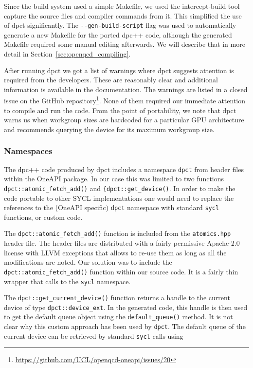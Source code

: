 \documentclass[../main]{subfiles}
\begin{document}
Since the build system used a simple Makefile, we used the intercept-build tool capture the source files and compiler commands from it.
This simplified the use of dpct significantly.
The \verb !--gen-build-script! flag was used to automatically generate a new Makefile for the ported dpc++ code, although the generated Makefile required some manual editing afterwards.
We will describe that in more detail in Section~\ref{sec:openqcd_compiling}.

After running dpct we got a list of warnings where dpct suggests attention is required from the developers.
These are reasonably clear and additional information is available in the documentation.
The warnings are listed in a closed issue on the GitHub repository\footnote{\url{https://github.com/UCL/openqcd-oneapi/issues/20}}.
None of them required our immediate attention to compile and run the code.
From the point of portability, we note that dpct warns us when workgroup sizes are hardcoded for a particular GPU architecture and recommends querying the device for its maximum workgroup size.

\subsubsection{Namespaces}\label{sec:openqcd_namespaces}

The dpc++ code produced by dpct includes a namespace \texttt{dpct} from header files within the OneAPI package.
In our case this was limited to two functions \verb!dpct::atomic_fetch_add()! and \verb!{dpct::get_device()!.
In order to make the code portable to other SYCL implementations one would need to replace the references to the (OneAPI specific) \texttt{dpct} namespace with standard \texttt{sycl} functions, or custom code.

The \verb!dpct::atomic_fetch_add()! function is included from the \texttt{atomics.hpp} header file.
The header files are distributed with a fairly permissive Apache-2.0 license with LLVM exceptions that allows to re-use them as long as all the modifications are noted.
Our solution was to include the \verb!dpct::atomic_fetch_add()! function within our source code.
It is a fairly thin wrapper that calls to the \texttt{sycl} namespace.

The \verb!dpct::get_current_device()! function returns a handle to the current device of type \verb #dpct::device_ext#.
In the generated code, this handle is then used to get the default queue object using the \verb #default_queue()# method.
It is not clear why this custom approach has been used by \texttt{dpct}.
The default queue of the current device can be retrieved by standard \texttt{sycl} calls using
\end{document}
